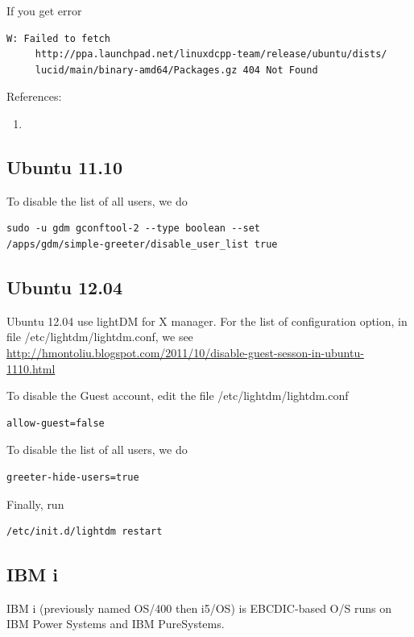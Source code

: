 If you get error
\begin{verbatim}
W: Failed to fetch
     http://ppa.launchpad.net/linuxdcpp-team/release/ubuntu/dists/
     lucid/main/binary-amd64/Packages.gz 404 Not Found
\end{verbatim}


References:
\begin{enumerate}
  \item
\end{enumerate}

\subsection{Ubuntu 11.10}

To disable the list of all users, we do
\begin{verbatim}
sudo -u gdm gconftool-2 --type boolean --set
/apps/gdm/simple-greeter/disable_user_list true
\end{verbatim}

\subsection{Ubuntu 12.04}

Ubuntu 12.04 use lightDM for X manager. For the list of configuration option, in
file /etc/lightdm/lightdm.conf, we see
\url{http://hmontoliu.blogspot.com/2011/10/disable-guest-sesson-in-ubuntu-1110.html}

To disable the Guest account, edit the file /etc/lightdm/lightdm.conf
\begin{verbatim}
allow-guest=false
\end{verbatim}

To disable the list of all users, we do
\begin{verbatim}
greeter-hide-users=true
\end{verbatim}


Finally, run
\begin{verbatim}
/etc/init.d/lightdm restart
\end{verbatim}

\subsection{IBM i}

IBM i (previously named OS/400 then i5/OS) is EBCDIC-based O/S runs on IBM Power
Systems and IBM PureSystems.

